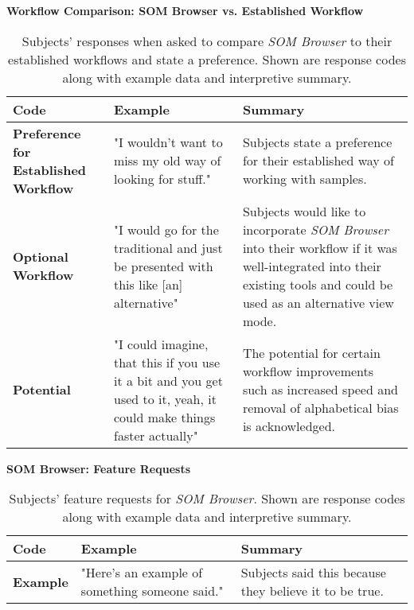 \begin{table}[!ht]
  \textbf{Workflow Comparison: SOM Browser vs. Established Workflow}
  \renewcommand{\arraystretch}{1.2}
  \centering
  \footnotesize
  \begin{tabular}{ p{4.0cm} p{4.75cm} p{4.75cm} }
  \hline
    \textbf{Code} & \textbf{Example} & \textbf{Summary} \\
    \hline
    \textbf{Preference for Established Workflow}
    &
    "I wouldn't want to miss my old way of looking for stuff."
    &
    Subjects state a preference for their established way of working with
    samples.
    \\
    \textbf{Optional Workflow}
    &
    "I would go for the traditional and just be presented with this like [an]
    alternative"
    &
    Subjects would like to incorporate \textit{SOM Browser} into their workflow
    if it was well-integrated into their existing tools and could be used as an
    alternative view mode.
    \\
    \textbf{Potential}
    &
    "I could imagine, that this if you use it a bit and you get used to it,
    yeah, it could make things faster actually"
    &
    The potential for certain workflow improvements such as increased speed and
    removal of alphabetical bias is acknowledged.
    \\
  \end{tabular}
  \caption[Workflow Comparison \textit{SOM Browser} vs. Established Workflow]
  {Subjects' responses when asked to compare \textit{SOM Browser} to their
  established workflows and state a preference. Shown are response codes along
  with example data and interpretive summary.}
  \label{table:responses_workflow_comparison}
\end{table}

\begin{table}[!ht]
  \textbf{SOM Browser: Feature Requests}
  \renewcommand{\arraystretch}{1.2}
  \centering
  \footnotesize
  \begin{tabular}{ p{4.0cm} p{4.75cm} p{4.75cm} }
  \hline
    \textbf{Code} & \textbf{Example} & \textbf{Summary} \\
    \hline
    \textbf{Example}
    &
    "Here's an example of something someone said."
    &
    Subjects said this because they believe it to be true.
    \\
  \end{tabular}
  \caption[SOM Browser: Feature Requests]{Subjects' feature requests for
  \textit{SOM Browser}. Shown are response codes along with example data and
  interpretive summary.}
  \label{table:responses_feature_requests}
\end{table}
